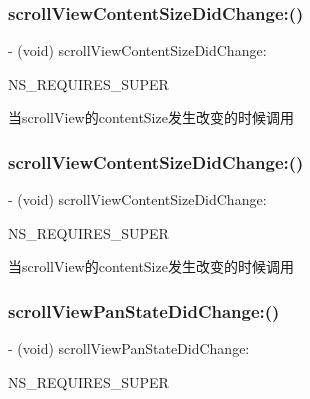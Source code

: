 \subsubsection{\texorpdfstring{scroll\+View\+Content\+Size\+Did\+Change\+:()}{scrollViewContentSizeDidChange:()}\hspace{0.1cm}{\footnotesize\ttfamily [2/3]}}
{\footnotesize\ttfamily -\/ (void) scroll\+View\+Content\+Size\+Did\+Change\+: \begin{DoxyParamCaption}\item[{(N\+S\+Dictionary $\ast$)}]{N\+S\+\_\+\+R\+E\+Q\+U\+I\+R\+E\+S\+\_\+\+S\+U\+P\+ER }\end{DoxyParamCaption}}

当scroll\+View的content\+Size发生改变的时候调用 \mbox{\label{interface_m_j_refresh_component_af32e7cdaf4d1503b551e77baa8266aa5}} 
\subsubsection{\texorpdfstring{scroll\+View\+Content\+Size\+Did\+Change\+:()}{scrollViewContentSizeDidChange:()}\hspace{0.1cm}{\footnotesize\ttfamily [3/3]}}
{\footnotesize\ttfamily -\/ (void) scroll\+View\+Content\+Size\+Did\+Change\+: \begin{DoxyParamCaption}\item[{(N\+S\+Dictionary $\ast$)}]{N\+S\+\_\+\+R\+E\+Q\+U\+I\+R\+E\+S\+\_\+\+S\+U\+P\+ER }\end{DoxyParamCaption}}

当scroll\+View的content\+Size发生改变的时候调用 \mbox{\label{interface_m_j_refresh_component_a16e5ed763451362a1bc76caa4ed761b1}} 
\subsubsection{\texorpdfstring{scroll\+View\+Pan\+State\+Did\+Change\+:()}{scrollViewPanStateDidChange:()}\hspace{0.1cm}{\footnotesize\ttfamily [1/3]}}
{\footnotesize\ttfamily -\/ (void) scroll\+View\+Pan\+State\+Did\+Change\+: \begin{DoxyParamCaption}\item[{(N\+S\+Dictionary $\ast$)}]{N\+S\+\_\+\+R\+E\+Q\+U\+I\+R\+E\+S\+\_\+\+S\+U\+P\+ER }\end{DoxyParamCaption}}

